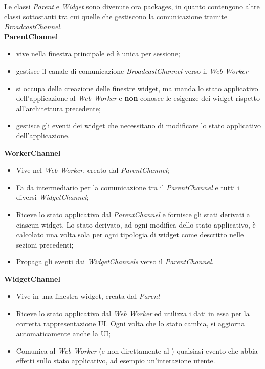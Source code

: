 Le classi \textit{Parent} e \textit{Widget} sono divenute ora packages, in quanto contengono altre classi sottostanti tra cui quelle che gestiscono la comunicazione tramite \textit{BroadcastChannel}. \\

\textbf{ParentChannel}
    \begin{itemize}
        \item vive nella finestra principale ed è unica per sessione;
        \item gestisce il canale di comunicazione \textit{BroadcastChannel} verso il \textit{Web Worker}
        \item si occupa della creazione delle finestre widget, ma manda lo stato applicativo dell'applicazione al \textit{Web Worker} e \textbf{non} conosce le esigenze dei widget rispetto all'architettura precedente;
        \item gestisce gli eventi dei widget che necessitano di modificare lo stato applicativo dell'applicazione.
    \end{itemize}
\textbf{WorkerChannel}
    \begin{itemize}
        \item Vive nel \textit{Web Worker}, creato dal \textit{ParentChannel};
        \item Fa da intermediario per la comunicazione tra il \textit{ParentChannel} e tutti i diversi \textit{WidgetChannel};
        \item Riceve lo stato applicativo dal \textit{ParentChannel} e fornisce gli stati derivati a ciascun widget. Lo stato derivato, ad ogni modifica dello stato applicativo, è calcolato una volta sola per ogni tipologia di widget come descritto nelle sezioni precedenti;
        \item Propaga gli eventi dai \textit{WidgetChannels} verso il \textit{ParentChannel}.
    \end{itemize}
\textbf{WidgetChannel}
    \begin{itemize}
        \item Vive in una finestra widget, creata dal \textit{Parent}
        \item Riceve lo stato applicativo dal \textit{Web Worker} ed utilizza i dati in essa per la corretta rappresentazione UI. Ogni volta che lo stato cambia, si aggiorna automaticamente anche la UI;
        \item Comunica al \textit{Web Worker} (e non direttamente al ) qualsiasi evento che abbia effetti sullo stato applicativo, ad esempio un'interazione utente.
    \end{itemize}
